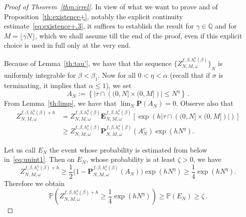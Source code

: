 \documentclass[10pt]{amsart}
\theoremstyle{definition}\newtheorem{defi}[theo]{Definition}\newtheorem{rema}[theo]{Remark}\newtheorem{exam}[theo]{Example}\newtheorem{exem}[theo]{Example}\newtheorem{nota}[theo]{Notation}
\newcommand{\ga}{\alpha}
\newcommand{\bP}{\ensuremath{\mathbf{P}}}
\newcommand{\bE}{\ensuremath{\mathbf{E}}}
\newcommand{\bbP}{\ensuremath{\mathbb{P}}}
\newcommand{\bbQ}{\ensuremath{\mathbb{Q}}}
\begin{document}
\begin{proof}[Proof of Theorem~\ref{thm:irrel}]
In view of what we want to prove and of Proposition~\ref{th:existence+}, notably the explicit continuity estimate~\eqref{eq:existence+.3}, it suffices to establish the result for $\gamma\in \bbQ$ and for $M=\lfloor \gamma N \rfloor$, which we shall assume till the end of the proof, even if this explicit choice is used in full only at the very end.

Because of Lemma~\ref{th:tau'}, we have that the sequence ${ \lbrace Z_{N,M,\omega}^{f,\beta,h_c^a(\beta)} \rbrace}_{N}$ is uniformly integrable for $\beta<\beta_1$. Now for all $0<\eta < \ga$ (recall that if $\sigma$ is terminating, it implies that $\ga\leq 1$), we set
\begin{equation}\label{eq:AN}
A_{N} := \left\lbrace \vert \tau \cap \left((0,N] \times (0,M] \right) \rvert \le N^{\eta} \right\rbrace\,.
\end{equation}
From Lemma~\ref{th:limp}, we have that $\lim_N \bP(A_{N}) =0$. Observe also that
\begin{equation}\label{eq:binfz}
\begin{split}
Z_{N,M,\omega}^{f,\beta,h_c^a(\beta)+h} & = Z_{N,M,\omega}^{f,\beta,h_c^a(\beta)} \bE_{N,M,\omega}^{f,\beta,h_c^a(\beta)} \left[\exp \left(h \lvert \tau \cap \left((0,N]\times(0,M] \right) \rvert \right)\right] \\
& \ge Z_{N,M,\omega}^{f,\beta,h_c^a(\beta)} \bP_{N,M,\omega}^{f,\beta,h_c^a(\beta)} \left({A}^{c}_{N} \right) \exp \left(h N^{\eta} \right).
\end{split}
\end{equation}


Let us call $E_N$ the event whose probability is estimated from below in~\eqref{eq:unint1}. Then on $E_N$, whose probability is at least $\zeta >0$, we have
\begin{equation}\label{eq:zfb}
Z_{N,M,\omega}^{f,\beta,h_c^a(\beta)+h}
\ge \frac{1}{2} \Big(1- \bP_{N,M,\omega}^{f,\beta,h_c^a(\beta)} \left(A_{N} \right) \Big) \exp \left(h N^\eta\right)
\ge \frac1 4 \exp \left(h N^{\eta}\right).
\end{equation}
Therefore we obtain
\begin{equation}\label{eq:zfpb}
\bbP \left(Z_{N,M,\omega}^{f,\beta,h_c^a(\beta)+h} \ge \frac{1}{4} \exp \left(h N^{\eta}\right) \right) \ge \bbP\left(E_N\right) \ge \zeta\,.
\end{equation}


\end{proof}
\end{document}
